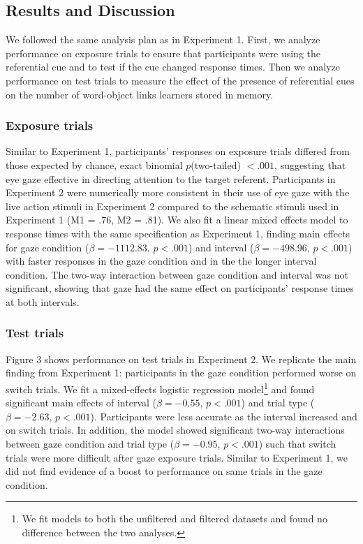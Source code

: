 \documentclass[10pt,letterpaper]{article}
\begin{document}
\subsection{Results and Discussion}

We followed the same analysis plan as in Experiment 1. First, we analyze performance on exposure trials to ensure that participants were using the referential cue and to test if the cue changed response times. Then we analyze performance on test trials to measure the effect of  the presence of referential cues on the number of word-object links learners stored in memory.

\subsubsection{Exposure trials}

Similar to Experiment 1, participants' responses on exposure trials differed from those expected by chance, exact binomial $p$(two-tailed) $< .001$, suggesting that eye gaze effective in directing attention to the target referent. Participants in Experiment 2 were numerically more consistent in their use of eye gaze with the live action stimuli in Experiment 2 compared to the schematic stimuli used in Experiment 1 (M1 = .76, M2 = .81). We also fit a linear mixed effects model to response times with the same specification as Experiment 1, finding main effects for gaze condition ($\beta= -1112.83$, $p< .001$) and interval ($\beta=  -498.96 $, $p< .001$) with faster responses in the gaze condition and in the the longer interval condition. The two-way interaction between gaze condition and interval was not significant, showing that gaze had the same effect on participants' response times at both intervals.

\subsubsection{Test trials}

Figure 3 shows performance on test trials in Experiment 2. We replicate the main finding from Experiment 1: participants in the gaze condition performed worse on switch trials. We fit a mixed-effects logistic regression model\footnote{We fit models to both the unfiltered and filtered datasets and found no difference between the two analyses.} and found significant main effects of interval ($\beta=  -0.55$, $p< .001$) and trial type ($\beta=  -2.63$, $p< .001$). Participants were less accurate as the interval increased and on switch trials. In addition, the model showed significant two-way interactions between gaze condition and trial type ($\beta=  -0.95$, $p< .001$) such that switch trials were more difficult after gaze exposure trials. Similar to Experiment 1, we did not find evidence of a boost to performance on same trials in the gaze condition. 
\end{document}

